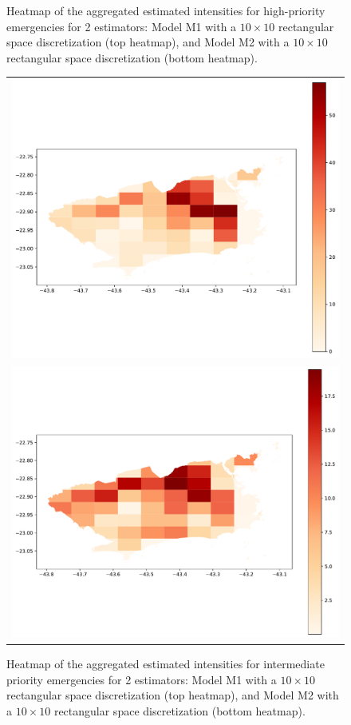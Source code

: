 \documentclass[article]{jss}
\begin{document}
\begin{figure}
\begin{tabular}{c}
\end{tabular}
\caption{Heatmap of the aggregated estimated intensities for high-priority emergencies for 2 estimators: Model M1 with a $10 \times 10$ rectangular space discretization (top heatmap), and Model M2 with a $10 \times 10$ rectangular space discretization (bottom heatmap).
\label{fig:heatmap2}}
\end{figure}

\begin{figure}
\centering
\begin{tabular}{c}
\includegraphics[scale=0.5]{heatP2Rect10x10_v3.pdf}\\
\includegraphics[scale=0.5]{heatCovP2Rect10x10_v3.pdf}
\end{tabular}
\caption{Heatmap of the aggregated estimated intensities for intermediate priority emergencies for 2 estimators: Model M1 with a $10 \times 10$ rectangular space discretization (top heatmap), and Model M2 with a $10 \times 10$ rectangular space discretization (bottom heatmap).
\label{fig:heatmap3}}
\end{figure}
\end{document}
